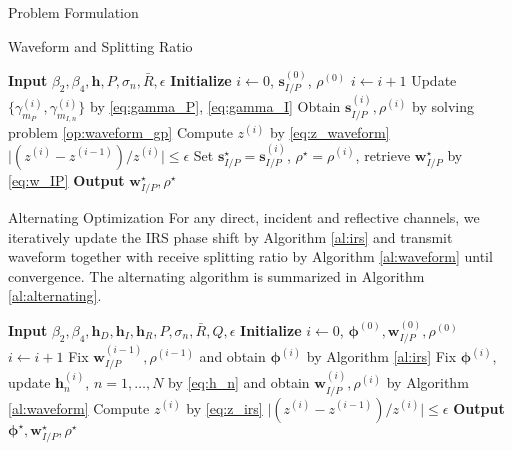 \documentclass[journal]{IEEEtran}
\begin{document}
\begin{section}{Problem Formulation}
\begin{subsection}{Waveform and Splitting Ratio}
\begin{algorithm}
			\label{al:waveform}
			\begin{algorithmic}[1]
				\State \textbf{Input} $\beta_2,\beta_4,\boldsymbol{h},P,\sigma_n,\bar{R},\epsilon$
				\State \textbf{Initialize} $i \gets 0$, $\boldsymbol{s}_{I/P}^{(0)}$, $\rho^{(0)}$
				\Repeat
					\State $i \gets i + 1$
					\State Update $\{\gamma_{m_P}^{(i)},\gamma_{m_{I,n}}^{(i)}\}$ by \ref{eq:gamma_P}, \ref{eq:gamma_I}
					\State Obtain $\boldsymbol{s}_{I/P}^{(i)},\rho^{(i)}$ by solving problem \ref{op:waveform_gp}
					\State Compute $z^{(i)}$ by \ref{eq:z_waveform}
				\Until $\lvert (z^{(i)} - z^{(i-1)}) / z^{(i)} \rvert \le \epsilon$
				\State Set $\boldsymbol{s}_{I/P}^{\star}=\boldsymbol{s}_{I/P}^{(i)}$, $\rho^{\star}=\rho^{(i)}$, retrieve $\boldsymbol{w}_{I/P}^{\star}$ by \ref{eq:w_IP}
				\State \textbf{Output} $\boldsymbol{w}_{I/P}^{\star}, \rho^{\star}$
			\end{algorithmic}
		\end{algorithm}
	\end{subsection}

	\begin{subsection}{Alternating Optimization}
		For any direct, incident and reflective channels, we iteratively update the IRS phase shift by Algorithm \ref{al:irs} and transmit waveform together with receive splitting ratio by Algorithm \ref{al:waveform} until convergence. The alternating algorithm is summarized in Algorithm \ref{al:alternating}.
		\begin{algorithm}
			\caption{Alternating Algorithm for Problem \ref{op:original}}
			\label{al:alternating}
			\begin{algorithmic}[1]
				\State \textbf{Input} $\beta_2,\beta_4,\boldsymbol{h}_D,\boldsymbol{h}_I,\boldsymbol{h}_R,P,\sigma_n,\bar{R},Q,\epsilon$
				\State \textbf{Initialize} $i \gets 0$, $\boldsymbol{\phi}^{(0)},\boldsymbol{w}_{I/P}^{(0)},\rho^{(0)}$
				\Repeat
					\State $i \gets i + 1$
					\State Fix $\boldsymbol{w}_{I/P}^{(i-1)},\rho^{(i-1)}$ and obtain $\boldsymbol{\phi}^{(i)}$ by Algorithm \ref{al:irs}
					\State Fix $\boldsymbol{\phi}^{(i)}$, update $\boldsymbol{h}_n^{(i)}$, $n=1,\dots,N$ by \ref{eq:h_n} and obtain $\boldsymbol{w}_{I/P}^{(i)}, \rho^{(i)}$ by Algorithm \ref{al:waveform}
					\State Compute $z^{(i)}$ by \ref{eq:z_irs}
				\Until $\lvert (z^{(i)} - z^{(i-1)}) / z^{(i)} \rvert \le \epsilon$
				\State \textbf{Output} $\boldsymbol{\phi}^{\star}, \boldsymbol{w}_{I/P}^{\star}, \rho^{\star}$
			\end{algorithmic}
		\end{algorithm}
	\end{subsection}


\end{section}
\end{document}
